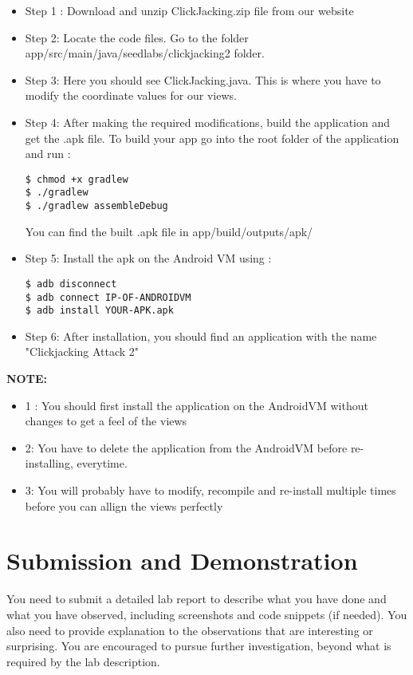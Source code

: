 \begin{itemize}
\item Step 1 : Download and unzip ClickJacking.zip file from our website
\item Step 2: Locate the code files. Go to the folder app/src/main/java/seedlabs/clickjacking2 folder.
\item Step 3: Here you should see ClickJacking.java. This is where you have to modify the coordinate values for our views.
\item Step 4: After making the required modifications, build the
application and get the .apk file. To build your app go into the root
folder of the application and run : 
\begin{lstlisting}
$ chmod +x gradlew
$ ./gradlew
$ ./gradlew assembleDebug
\end{lstlisting}

You can find the built .apk file in app/build/outputs/apk/
\item Step 5: Install the apk on the Android VM using : 

\begin{lstlisting}
$ adb disconnect
$ adb connect IP-OF-ANDROIDVM
$ adb install YOUR-APK.apk
\end{lstlisting}

\item Step 6: After installation, you should find an application with the name "Clickjacking Attack 2" 
\end{itemize}

\textbf{NOTE:} 

\begin{itemize}
\item 1 : You should first install the application on the AndroidVM without
changes to get a feel of the views

\item 2: You have to delete the application from the AndroidVM before re-installing, everytime.

\item 3: You will probably have to modify, recompile and re-install multiple times before you can allign the views perfectly
\end{itemize}

\section{Submission and Demonstration}

You need to submit a detailed lab report to describe what you have done and what you have
observed, including screenshots and code snippets (if needed). You also need to provide
explanation to the observations that are interesting or surprising. You are encouraged to
pursue further investigation, beyond what is required by the lab description.


